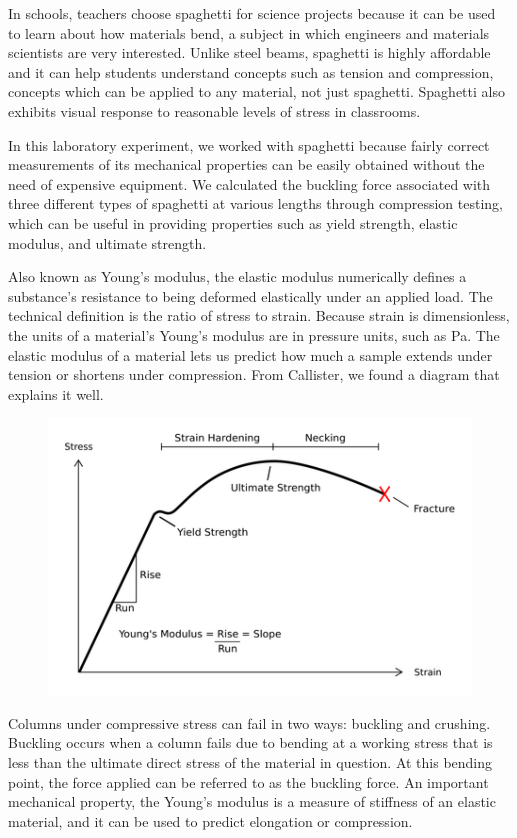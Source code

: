 \documentclass[12pt]{article}
\begin{document}
In schools, teachers choose spaghetti for science projects because it can be used to learn about how materials bend, a subject in which engineers and materials scientists are very interested. Unlike steel beams, spaghetti is highly affordable and it can help students understand concepts such as tension and compression, concepts which can be applied to any material, not just spaghetti. Spaghetti also exhibits visual response to reasonable levels of stress in classrooms.

In this laboratory experiment, we worked with spaghetti because fairly correct measurements of its mechanical properties can be easily obtained without the need of expensive equipment. We calculated the buckling force associated with three different types of spaghetti at various lengths through compression testing, which can be useful in providing properties such as yield strength, elastic modulus, and ultimate strength.

Also known as Young's modulus, the elastic modulus numerically defines a substance's resistance to being deformed elastically under an applied load. The technical definition is the ratio of stress to strain. Because strain is dimensionless, the units of a material's Young's modulus are in pressure units, such as Pa. The elastic modulus of a material lets us predict how much a sample extends under tension or shortens under compression. From Callister, we found a diagram that explains it well.

\begin{figure}[h]
	\centering
	\includegraphics[scale=0.3]{Lab1YM.png}
\end{figure}

Columns under compressive stress can fail in two ways: buckling and crushing. Buckling occurs when a column fails due to bending at a working stress that is less than the ultimate direct stress of the material in question. At this bending point, the force applied can be referred to as the buckling force. An important mechanical property, the Young's modulus is a measure of stiffness of an elastic material, and it can be used to predict elongation or compression.
\end{document}
